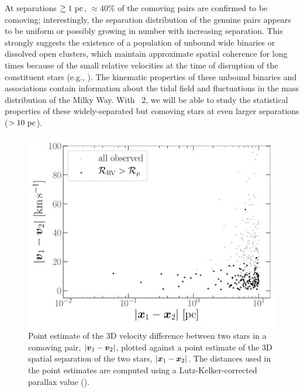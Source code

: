 \documentclass[modern, letterpaper]{aastex61}
\newcommand{\gaia}{\project{Gaia}}
\newcommand{\DR}[1]{\acronym{DR}#1}
\begin{document}
At separations $\gtrsim 1~\mathrm{pc}$, $\approx 40\%$ of the comoving pairs are
confirmed to be comoving; interestingly, the separation distribution of the
genuine pairs appears to be uniform or possibly growing in number with
increasing separation.
This strongly suggests the existence of a population of unbound wide binaries or
dissolved open clusters, which maintain approximate spatial coherence for long
times because of the small relative velocities at the time of disruption of the
constituent stars (e.g., \citealt{Jiang:2010}).
The kinematic properties of these unbound binaries and associations contain
information about the tidal field and fluctuations in the mass distribution of
the Milky Way.
With \gaia\ \DR{2}, we will be able to study the statistical properties of these
widely-separated but comoving stars at even larger separations ($>10~\mathrm{pc}$).

\begin{figure}[htbp]
  \begin{center}
    \includegraphics[width=\linewidth]{dx-dv.pdf}
  \end{center}
  \caption{%
    Point estimate of the 3D velocity difference between two stars in a comoving
    pair, $|\boldsymbol{v}_1 - \boldsymbol{v}_2|$, plotted against a point estimate of the 3D
    spatial separation of the two stars, $|\boldsymbol{x}_1 - \boldsymbol{x}_2|$.
    The distances used in the point estimates are computed using a
    Lutz-Kelker-corrected parallax value (\citealt{Lutz:1973}).
    \label{fig:dx-dv}}
\end{figure}
\end{document}
